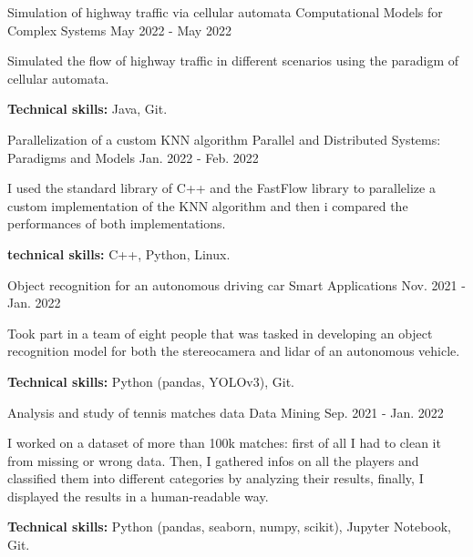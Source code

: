 \begin{cventries}
\cventry
{Simulation of highway traffic via cellular automata} %
{Computational Models for Complex Systems} %
{} %
{May 2022 - May 2022} %
{
    \begin{cvitems}
        \item{Simulated the flow of highway traffic in different scenarios using the paradigm of cellular automata.}
        \item{\textbf{Technical skills:} Java, Git.}
    \end{cvitems}
}

\cventry
{Parallelization of a custom KNN algorithm} %
{Parallel and Distributed Systems: Paradigms and Models} %
{} %
{Jan. 2022 - Feb. 2022} %
{
    \begin{cvitems}
        \item{I used the standard library of C++ and the FastFlow library to parallelize a custom implementation of the KNN algorithm and then i compared the performances of both implementations.}
        \item{\textbf{technical skills:} C++, Python, Linux.}
    \end{cvitems}
}

\cventry
{Object recognition for an autonomous driving car} %
{Smart Applications} %
{} %
{Nov. 2021 - Jan. 2022} %
{
    \begin{cvitems}
        \item{Took part in a team of eight people that was tasked in developing an object recognition model for both the stereocamera and lidar of an autonomous vehicle.}
        \item{\textbf{Technical skills:} Python (pandas, YOLOv3), Git.}
    \end{cvitems}
}

\cventry
{Analysis and study of tennis matches data} %
{Data Mining} %
{} %
{Sep. 2021 - Jan. 2022} %
{
    \begin{cvitems}
        \item {I worked on a dataset of more than 100k matches: first of all I had to clean it from missing or wrong data. Then, I gathered infos on all the players and classified them into different categories by analyzing their results, finally, I displayed the results in a human-readable way.}
        \item{\textbf{Technical skills:} Python (pandas, seaborn, numpy, scikit), Jupyter Notebook, Git.}
    \end{cvitems}
}


\end{cventries}
